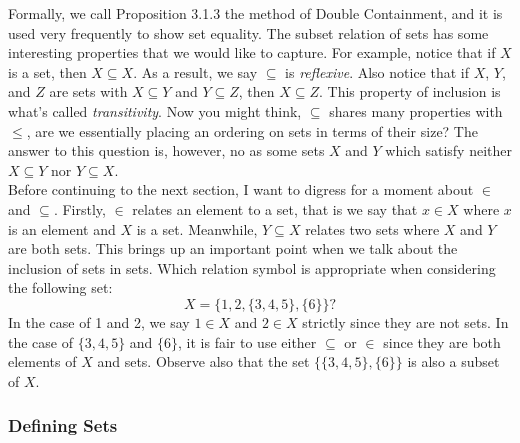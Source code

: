 \documentclass[12pt]{book}
\begin{document}
Formally, we call Proposition 3.1.3 the method of Double Containment, and it is used very frequently to show set equality. The subset relation of sets has some interesting properties that we would like to capture. For example, notice that if $X$ is a set, then $X\subseteq X$. As a result, we say $\subseteq$ is \textit{reflexive}. Also notice that if $X$, $Y$, and $Z$ are sets with $X\subseteq Y$ and $Y\subseteq Z$, then $X\subseteq Z$. This property of inclusion is what's called \textit{transitivity}. Now you might think, $\subseteq$ shares many properties with $\leq$, are we essentially placing an ordering on sets in terms of their size? The answer to this question is, however, no as some sets $X$ and $Y$ which satisfy neither $X\subseteq Y$ nor $Y\subseteq X$.\\

Before continuing to the next section, I want to digress for a moment about $\in$ and $\subseteq$. Firstly, $\in$ relates an element to a set, that is we say that $x\in X$ where $x$ is an element and $X$ is a set. Meanwhile, $Y\subseteq X$ relates two sets where $X$ and $Y$ are both sets. This brings up an important point when we talk about the inclusion of sets in sets. Which relation symbol is appropriate when considering the following set:
\[X=\{1,2,\{3,4,5\},\{6\}\}?\]
In the case of 1 and 2, we say $1\in X$ and $2\in X$ strictly since they are not sets. In the case of $\{3,4,5\}$ and $\{6\}$, it is fair to use either $\subseteq$ or $\in$ since they are both elements of $X$ and sets. Observe also that the set $\{\{3,4,5\},\{6\}\}$ is also a subset of $X$.\\

\subsubsection{Defining Sets}
\end{document}
